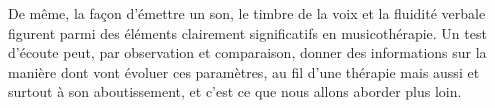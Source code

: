 De même, la façon d'émettre un son, le timbre de la voix et la fluidité
verbale figurent parmi des
éléments clairement significatifs en musicothérapie.
Un test d'écoute peut, par observation et comparaison, donner des informations sur la manière dont vont évoluer ces paramètres, au fil d'une thérapie mais aussi et surtout à son aboutissement, et c'est ce que nous allons aborder plus loin.




